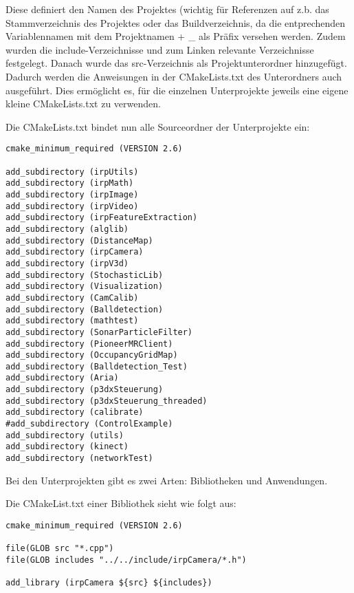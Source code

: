 Diese definiert den Namen des Projektes (wichtig
für Referenzen auf z.b. das Stammverzeichnis des Projektes oder das
Buildverzeichnis, da die entprechenden Variablennamen mit dem Projektnamen
+ \_
als Präfix versehen werden. Zudem wurden die include-Verzeichnisse und zum
Linken relevante Verzeichnisse festgelegt. Danach wurde das src-Verzeichnis
 als
Projektunterordner hinzugefügt. Dadurch werden die Anweisungen in der
CMakeLists.txt des Unterordners auch ausgeführt. Dies ermöglicht es, für
die
einzelnen Unterprojekte jeweils eine eigene kleine CMakeLists.txt zu
verwenden.

Die CMakeLists.txt bindet nun alle Sourceordner der Unterprojekte ein:

\begin{lstlisting}[captionpos=b,caption={CMakeLists.txt für den Sourceordner}]
%\begin{lstlisting}
cmake_minimum_required (VERSION 2.6)

add_subdirectory (irpUtils)
add_subdirectory (irpMath)
add_subdirectory (irpImage)
add_subdirectory (irpVideo)
add_subdirectory (irpFeatureExtraction)
add_subdirectory (alglib)
add_subdirectory (DistanceMap)
add_subdirectory (irpCamera)
add_subdirectory (irpV3d)
add_subdirectory (StochasticLib)
add_subdirectory (Visualization)
add_subdirectory (CamCalib)
add_subdirectory (Balldetection)
add_subdirectory (mathtest)
add_subdirectory (SonarParticleFilter)
add_subdirectory (PioneerMRClient)
add_subdirectory (OccupancyGridMap)
add_subdirectory (Balldetection_Test)
add_subdirectory (Aria)
add_subdirectory (p3dxSteuerung)
add_subdirectory (p3dxSteuerung_threaded)
add_subdirectory (calibrate)
#add_subdirectory (ControlExample)
add_subdirectory (utils)
add_subdirectory (kinect)
add_subdirectory (networkTest)
\end{lstlisting}

Bei den Unterprojekten gibt es zwei Arten: Bibliotheken und Anwendungen.

Die CMakeList.txt einer Bibliothek sieht wie folgt aus:
\begin{lstlisting}[captionpos=b,caption={CMakeLists.txt einer Bibliothek am
    Beispiel irpCamera}]
%\begin{lstlisting}
cmake_minimum_required (VERSION 2.6)

file(GLOB src "*.cpp")
file(GLOB includes "../../include/irpCamera/*.h")

add_library (irpCamera ${src} ${includes})
\end{lstlisting}

